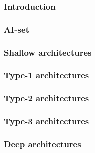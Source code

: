 \begin{frame}
	\frametitle{Introduction}
\end{frame}

\begin{frame}
	\frametitle{AI-set}
\end{frame}

\begin{frame}
	\frametitle{Shallow architectures}
\end{frame}

\begin{frame}
	\frametitle{Type-1 architectures}
\end{frame}

\begin{frame}
	\frametitle{Type-2 architectures}
\end{frame}

\begin{frame}
	\frametitle{Type-3 architectures}
\end{frame}

\begin{frame}
	\frametitle{Deep architectures}
\end{frame}
